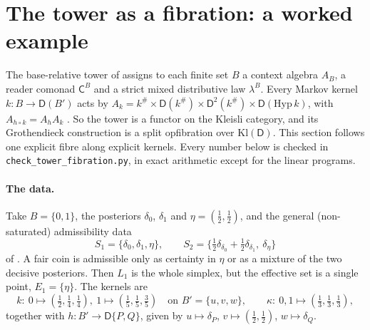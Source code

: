 \documentclass[11pt]{article}
\theoremstyle{definition}
\theoremstyle{remark}
\newcommand{\D}{\mathsf{D}}
\newcommand{\C}{\mathsf{C}}
\begin{document}
\section{The tower as a fibration: a worked example}\label{sec:fibration}

The base-relative tower of \cite{Tower} assigns to each finite set $B$ a context algebra $A_B$, a reader comonad
$\C^B$ and a strict mixed distributive law $\lambda^B$. Every Markov kernel $k\colon B\to\D(B')$ acts by
$A_k=k^\#\times\D(k^\#)\times\D^2(k^\#)\times\D(\mathrm{Hyp}\,k)$, with $A_{h\circ k}=A_hA_k$ \cite[Prop.~9.14]{Tower}. So the
tower is a functor on the Kleisli category, and its Grothendieck construction is a split opfibration over
$\mathrm{Kl}(\D)$. This section follows one explicit fibre along explicit kernels. Every number below is checked in
\texttt{check\_tower\_fibration.py}, in exact arithmetic except for the linear programs.

\paragraph{The data.} Take $B=\{0,1\}$, the posteriors $\delta_0$, $\delta_1$ and $\eta=(\tfrac12,\tfrac12)$, and the general
(non-saturated) admissibility data
\[
S_1=\{\delta_0,\delta_1,\eta\},\qquad
S_2=\big\{\tfrac12\delta_{\delta_0}+\tfrac12\delta_{\delta_1},\ \delta_\eta\big\}
\]
of \cite[Def.~10.11]{Tower}. A fair coin is admissible only as certainty in $\eta$ or as a mixture of the two decisive
posteriors. Then $L_1$ is the whole simplex, but the effective set is a single point, $E_1=\{\eta\}$. The kernels
are
\[
k\colon\ 0\mapsto(\tfrac12,\tfrac14,\tfrac14),\ 1\mapsto(\tfrac15,\tfrac15,\tfrac35)\quad\text{on }B'=\{u,v,w\},\qquad
\kappa\colon\ 0,1\mapsto(\tfrac13,\tfrac13,\tfrac13),
\]
together with $h\colon B'\to\D\{P,Q\}$, given by $u\mapsto\delta_P$, $v\mapsto(\tfrac12,\tfrac12)$, $w\mapsto\delta_Q$.
\end{document}

